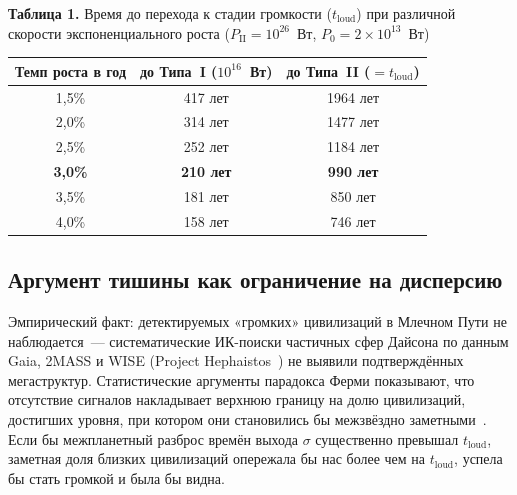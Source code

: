 \documentclass[12pt,a4paper]{article}
\begin{document}
\begin{center}
\textbf{Таблица 1.} Время до перехода к стадии громкости ($t_{\mathrm{loud}}$) при различной скорости экспоненциального роста ($P_{\mathrm{II}} = 10^{26}$~Вт, $P_0 = 2 \times 10^{13}$~Вт)

\medskip
\begin{tabular}{c c c}
\hline
Темп роста в год & до Типа~I ($10^{16}$~Вт) & до Типа~II ($= t_{\mathrm{loud}}$) \\
\hline
1{,}5\% & 417 лет & 1964 лет \\
2{,}0\% & 314 лет & 1477 лет \\
2{,}5\% & 252 лет & 1184 лет \\
\textbf{3{,}0\%} & \textbf{210 лет} & \textbf{990 лет} \\
3{,}5\% & 181 лет & 850 лет \\
4{,}0\% & 158 лет & 746 лет \\
\hline
\end{tabular}
\end{center}

\subsection{Аргумент тишины как ограничение на дисперсию}
\label{sec:silence_sigma}

Эмпирический факт: детектируемых «громких» цивилизаций в Млечном Пути не наблюдается~--- систематические ИК-поиски частичных сфер Дайсона по данным Gaia, 2MASS и WISE (Project Hephaistos~\cite{Suazo2024}) не выявили подтверждённых мегаструктур. Статистические аргументы парадокса Ферми показывают, что отсутствие сигналов накладывает верхнюю границу на долю цивилизаций, достигших уровня, при котором они становились бы межзвёздно заметными~\cite{Wright2014,Hanson2021}. Если бы межпланетный разброс времён выхода $\sigma$ существенно превышал $t_{\mathrm{loud}}$, заметная доля близких цивилизаций опережала бы нас более чем на $t_{\mathrm{loud}}$, успела бы стать громкой и была бы видна.
\end{document}
